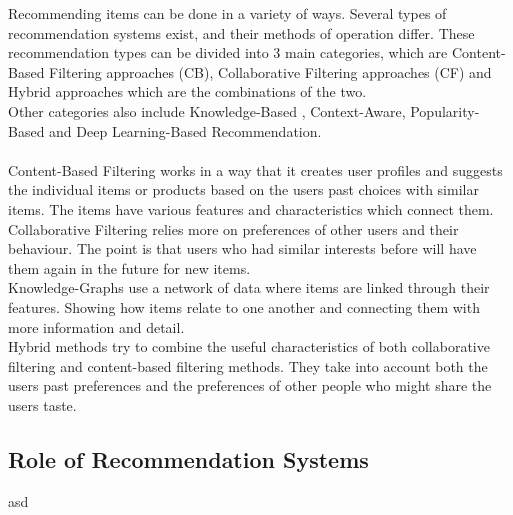 \documentclass[10pt,oneside,english,a4paper]{article}
\begin{document}
%
Recommending items can be done in a variety of ways. Several types of recommendation systems exist, and their methods of operation differ. These recommendation types can be divided into 3 main categories, which are Content-Based Filtering approaches (CB), Collaborative Filtering approaches (CF) and Hybrid approaches which are the combinations of the two. \\
Other categories also include Knowledge-Based , Context-Aware, Popularity-Based and Deep Learning-Based Recommendation.\\\\
%
%
Content-Based Filtering works in a way that it creates user profiles and suggests the individual items or products based on the users past choices with similar items. The items have various features and characteristics which connect them.\\
%
%
Collaborative Filtering relies more on preferences of other users and their behaviour. The point is that users who had similar interests before will have them again in the future for new items.\\
%
%
Knowledge-Graphs use a network of data where items are linked through their features. Showing how items relate to one another and connecting them with more information and detail.\\
%
%
Hybrid methods try to combine the useful characteristics of both collaborative filtering and content-based filtering methods. They take into account both the users past preferences and the preferences of other people who might share the users taste.\\
%
%
%
%
%
\clearpage
\subsection{Role of Recommendation Systems}
asd

\clearpage
\end{document}
